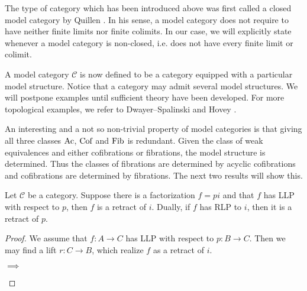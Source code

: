 \documentclass[../thesis.tex]{subfiles}
\begin{document}
            \begin{remark}
                The type of category which has been introduced above was first called a closed model category by Quillen \cite{Quillen67}. In his sense, a model category does not require to have neither finite limits nor finite colimits. In our case, we will explicitly state whenever a model category is non-closed, i.e. does not have every finite limit or colimit.
            \end{remark}

            A model category $\mathcal{C}$ is now defined to be a category equipped with a particular model structure. Notice that a category may admit several model structures. We will postpone examples until sufficient theory have been developed. For more topological examples, we refer to Dwayer--Spalinski \cite{Dwyer95} and Hovey \cite{Hovey99}.

            An interesting and a not so non-trivial property of model categories is that giving all three classes $\tt{Ac}$, $\tt{Cof}$ and $\tt{Fib}$ is redundant. Given the class of weak equivalences and either cofibrations or fibrations, the model structure is determined. Thus the classes of fibrations are determined by acyclic cofibrations and cofibrations are determined by fibrations. The next two results will show this.

            \begin{lemma}\label{lem: retract-argument}
                Let $\mathcal{C}$ be a category. Suppose there is a factorization $f = pi$ and that $f$ has LLP with respect to $p$, then $f$ is a retract of $i$. Dually, if $f$ has RLP to $i$, then it is a retract of $p$.
            \end{lemma}

            \begin{proof}
                We assume that $f : A \rightarrow C$ has LLP with respect to $p : B \rightarrow C$. Then we may find a lift $r : C \rightarrow B$, which realize $f$ as a retract of $i$.
                
                \begin{center}
                     $\implies$
                \end{center}
            \end{proof}
\end{document}
